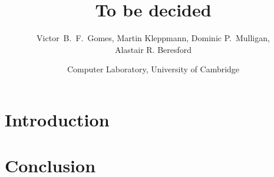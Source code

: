 \documentclass[letter,11pt]{article}
\title{To be decided}
\author{Victor~B.~F.~Gomes, Martin Kleppmann, Dominic P.~Mulligan,\\Alastair R. Beresford}
\date{Computer Laboratory, University of Cambridge}
\begin{document}
\maketitle


\section{Introduction}
\label{sect.introduction}

\section{Conclusion}
\label{sect.conclusion}
\end{document}
